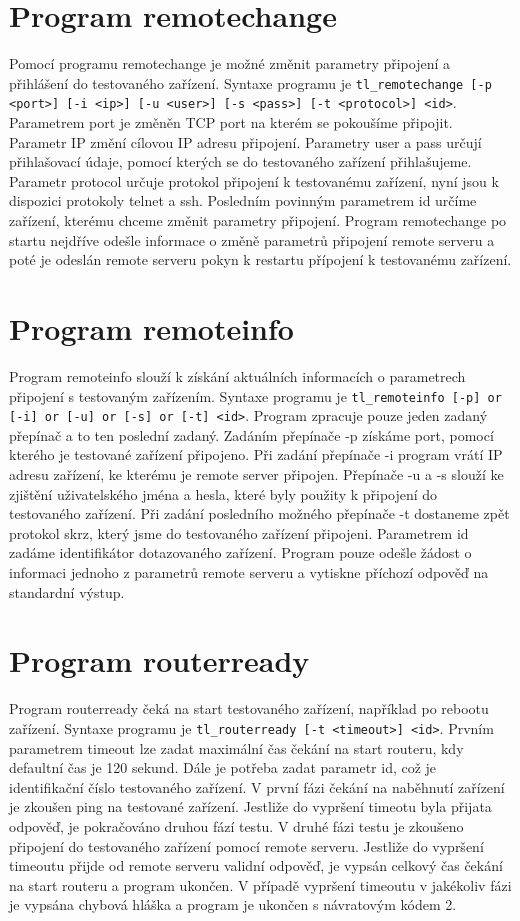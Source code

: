 \section{Program remotechange}
Pomocí programu remotechange je možné změnit parametry připojení a přihlášení do testovaného zařízení. Syntaxe programu je \texttt{tl\_remotechange [-p <port>] [-i <ip>] [-u <user>] [-s <pass>] [-t <protocol>] <id>}. Parametrem port je změněn TCP port na kterém se pokoušíme připojit. Parametr IP změní cílovou IP adresu připojení. Parametry user a pass určují přihlašovací údaje, pomocí kterých se do testovaného zařízení přihlašujeme. Parametr protocol určuje protokol připojení k testovanému zařízení, nyní jsou k dispozici protokoly telnet a ssh. Posledním povinným parametrem id určíme zařízení, kterému chceme změnit parametry připojení. Program remotechange po startu nejdříve odešle informace o změně parametrů připojení remote serveru a poté je odeslán remote serveru pokyn k restartu přípojení k testovanému zařízení.

\section{Program remoteinfo}
Program remoteinfo slouží k získání aktuálních informacích o parametrech připojení s testovaným zařízením. Syntaxe programu je \texttt{tl\_remoteinfo [-p] or [-i] or [-u] or [-s] or [-t] <id>}. Program zpracuje pouze jeden zadaný přepínač a to ten poslední zadaný. Zadáním přepínače -p získáme port, pomocí kterého je testované zařízení připojeno. Při zadání přepínače -i program vrátí IP adresu zařízení, ke kterému je remote server připojen. Přepínače -u a -s slouží ke zjištění uživatelského jména a hesla, které byly použity k připojení do testovaného zařízení. Při zadání posledního možného přepínače -t dostaneme zpět protokol skrz, který jsme do testovaného zařízení připojeni. Parametrem id zadáme identifikátor dotazovaného zařízení. Program pouze odešle žádost o informaci jednoho z parametrů remote serveru a vytiskne příchozí odpověď na standardní výstup.

\section{Program routerready}
Program routerready čeká na start testovaného zařízení, například po rebootu zařízení. Syntaxe programu je \texttt{tl\_routerready [-t <timeout>]  <id>}. Prvním parametrem timeout lze zadat maximální čas čekání na start routeru, kdy defaultní čas je 120 sekund. Dále je potřeba zadat parametr id, což je identifikační číslo testovaného zařízení. V první fázi čekání na naběhnutí zařízení je zkoušen ping na testované zařízení. Jestliže do vypršení timeotu byla přijata odpověď, je pokračováno druhou fází testu. V druhé fázi testu je zkoušeno připojení do testovaného zařízení pomocí remote serveru. Jestliže do vypršení timeoutu přijde od remote serveru validní odpověď, je vypsán celkový čas čekání na start routeru a program ukončen. V případě vypršení timeoutu v jakékoliv fázi je vypsána chybová hláška a program je ukončen s návratovým kódem 2.

